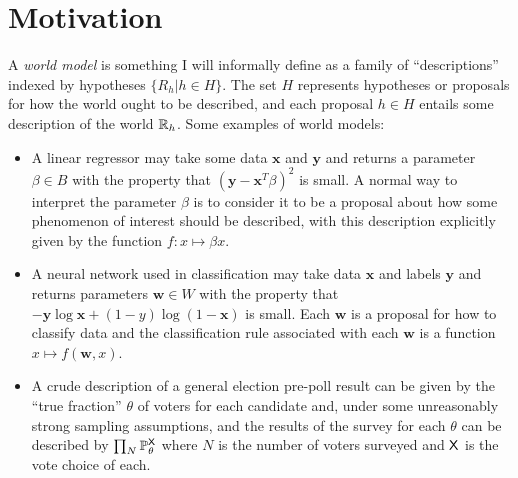 \section{Motivation}

A \emph{world model} is something I will informally define as a family of ``descriptions'' indexed by hypotheses $\{R_h|h\in H\}$. The set $H$ represents hypotheses or proposals for how the world ought to be described, and each proposal $h\in H$ entails some description of the world $\mathbb{R}_h$. Some examples of world models:

\begin{itemize}
    \item A linear regressor may take some data $\mathbf{x}$ and $\mathbf{y}$ and returns a parameter $\beta\in B$ with the property that $(\mathbf{y}-\mathbf{x}^T \beta)^2$ is small. A normal way to interpret the parameter $\beta$ is to consider it to be a proposal about how some phenomenon of interest should be described, with this description explicitly given by the function $f:x\mapsto \beta x$.
    \item A neural network used in classification may take data $\mathbf{x}$ and labels $\mathbf{y}$ and returns parameters $\mathbf{w}\in W$ with the property that $-\mathbf{y} \log \mathbf{x}+(1-y)\log(1-\mathbf{x})$ is small. Each $\mathbf{w}$ is a proposal for how to classify data and the classification rule associated with each $\mathbf{w}$ is a function $x\mapsto f(\mathbf{w},x)$.
    \item A crude description of a general election pre-poll result can be given by the ``true fraction'' $\theta$ of voters for each candidate and, under some unreasonably strong sampling assumptions, and the results of the survey for each $\theta$ can be described by $\prod_N\mathbb{P}_\theta^{\mathsf{X}}$ where $N$ is the number of voters surveyed and $\mathsf{X}$ is the vote choice of each.
\end{itemize}

